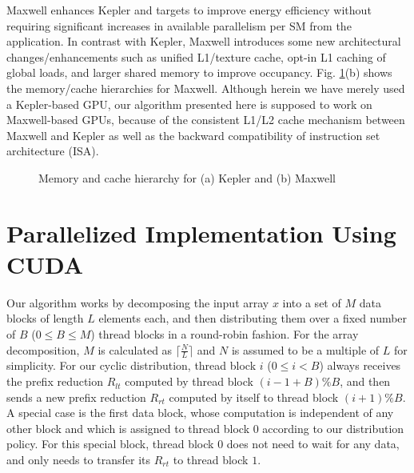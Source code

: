 \documentclass[article]{elsarticle}
\begin{document}
{Maxwell enhances Kepler and targets to improve energy efficiency without requiring significant increases in available parallelism per SM from the application. In contrast with Kepler, Maxwell introduces some new architectural changes/enhancements such as unified L1/texture cache, opt-in L1 caching of global loads, and larger shared memory to improve occupancy. Fig. \ref{fig:gpu_memory}(b) shows the memory/cache hierarchies for Maxwell. Although herein we have merely used a Kepler-based GPU, our algorithm presented here is supposed to work on Maxwell-based GPUs, because of the consistent L1/L2 cache mechanism between Maxwell and Kepler as well as the backward compatibility of instruction set architecture (ISA).
\begin{figure}[!h]
\centering
\begin{minipage}[b]{0.49\linewidth}
\end{minipage}
\begin{minipage}[b]{0.49\linewidth}
\end{minipage}

\caption{Memory and cache hierarchy for (a) Kepler and (b) Maxwell}
\label{fig:gpu_memory}
\end{figure}


\section{Parallelized Implementation Using CUDA}
Our algorithm works by decomposing the input array $x$ into a set of $M$ data blocks of length $L$ elements each, and then distributing them over a fixed number of $B$ (\mbox{$0\leq B \leq M$}) thread blocks in a round-robin fashion. For the array decomposition, $M$ is calculated as $\lceil\frac{N}{L}\rceil$ and $N$ is assumed to be a multiple of $L$ for simplicity. For our cyclic distribution, thread block $i$ (\mbox{$0\leq i < B$}) always receives the prefix reduction $R_{lt}$ computed by thread block $(i-1+B)\% B$, and then sends a new prefix reduction $R_{rt}$ computed by itself to thread block $(i+1)\% B$. A special case is the first data block, whose computation is independent of any other block  and which is assigned to thread block $0$ according to our distribution policy. For this special block, thread block $0$ does not need to wait for any data, and only needs to transfer its $R_{rt}$ to thread block $1$.

}
\end{document}
